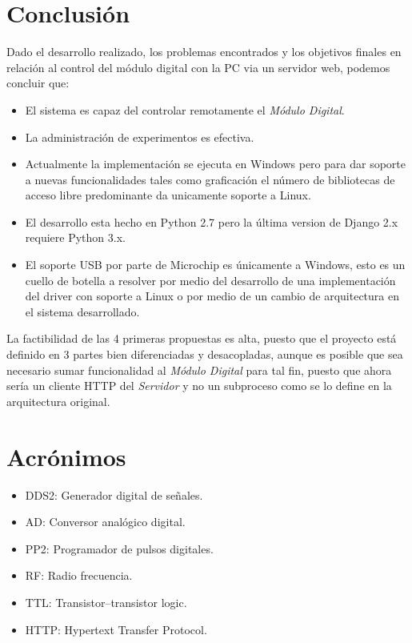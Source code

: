 \section{Conclusi\'on}

Dado el desarrollo realizado, los problemas encontrados y los objetivos finales en relaci\'on
al control del m\'odulo digital con la PC via un servidor web, podemos concluir que:

\begin{itemize}
    \item El sistema es capaz del controlar remotamente el \textit{M\'odulo Digital}.
    \item La administraci\'on de experimentos es efectiva.
    \item Actualmente la implementaci\'on se ejecuta en Windows pero para dar soporte a nuevas funcionalidades
    tales como graficaci\'on el n\'umero de bibliotecas de acceso libre predominante da unicamente soporte a Linux.
    \item El desarrollo esta hecho en Python 2.7 pero la \'ultima version de Django 2.x requiere Python 3.x.
    \item El soporte USB por parte de Microchip es \'unicamente a Windows, esto es un cuello de botella a resolver
    por medio del desarrollo de una implementaci\'on del driver con soporte a Linux o por medio de un cambio 
    de arquitectura en el sistema desarrollado.
\end{itemize}

La factibilidad de las 4 primeras propuestas es alta, puesto que el proyecto est\'a definido en 3 partes
bien diferenciadas y desacopladas, aunque es posible que sea necesario sumar funcionalidad 
al \textit{M\'odulo Digital} para tal fin, puesto que ahora ser\'ia un cliente HTTP del \textit{Servidor} y
no un subproceso como se lo define en la arquitectura original.

\newpage

\section{Acr\'onimos}

\begin{itemize}
    \item DDS2: Generador digital de se\~nales.
    \item AD: Conversor anal\'ogico digital.
    \item PP2: Programador de pulsos digitales.
    \item RF: Radio frecuencia.
    \item TTL: Transistor–transistor logic.
    \item HTTP: Hypertext Transfer Protocol.
\end{itemize}

\newpage
